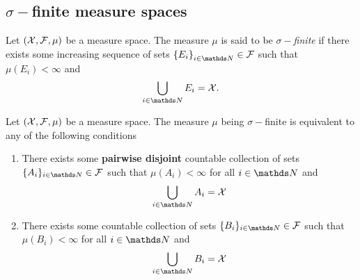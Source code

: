 \subsection{$\sigma-$finite measure spaces}
\begin{defn}
\label{def:sigmaFinite}Let $\left(\mathcal{X},\mathcal{F},\mu\right)$ be a measure
space. The measure $\mu$ is said to be $\sigma-$\emph{finite }if
there exists some increasing sequence of sets $\left\{ E_{i}\right\} _{i\in\N}\in\F$
such that $\mu\left(E_{i}\right)<\infty$ and
\[
\bigcup_{i\in\N}E_{i}=\X.
\]
\end{defn}

\begin{prop}
\label{prop:equivSigmaFinite}Let $\left(\mathcal{X},\mathcal{F},\mu\right)$ be a measure
space. The measure $\mu$ being $\sigma-$finite is equivalent to
any of the following conditions

\begin{enumerate}[label=(\roman*),leftmargin=.1\linewidth,rightmargin=0.15\linewidth]
	\item There exists some \textbf{pairwise disjoint} countable collection of sets $\{A_i\}_{i\in\N} \in \F$ such that $ \mu\left(A_i\right) < \infty $ for all $ i \in \N $ and
	\[
					\bigcup_{i\in\N}A_i = \X
	\]
	\item There exists some countable collection of sets $\{B_i\}_{i\in\N} \in \F$ such that $ \mu\left(B_i\right) < \infty $ for all $ i \in \N $ and
	\[
					\bigcup_{i\in\N}B_i = \X
	\]
\end{enumerate}
\end{prop}

